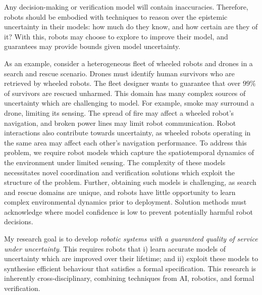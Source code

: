 \documentclass[12pt]{article}
\begin{document}

Any decision-making or verification model will contain inaccuracies.
%
Therefore, robots should be embodied with techniques to reason over the epistemic uncertainty in their models: how much do they know, and how certain are they of it?
%
With this, robots may choose to explore to improve their model, and guarantees may provide bounds given model uncertainty.

\fi

As an example, consider a heterogeneous fleet of wheeled robots and drones in a search and rescue scenario.
%
Drones must identify human survivors who are retrieved by wheeled robots.
%
The fleet designer wants to guarantee that over $99\%$ of survivors are rescued unharmed.
%
This domain has many complex sources of uncertainty which are challenging to model.
%
For example, smoke may surround a drone, limiting its sensing.
%
The spread of fire may affect a wheeled robot's navigation, and broken power lines may limit robot communication. 
%
Robot interactions also contribute towards uncertainty, as wheeled robots operating in the same area may affect each other's navigation performance.
%
To address this problem, we require robot models which capture the spatiotemporal dynamics of the environment under limited sensing.
%
The complexity of these models necessitates novel coordination and verification solutions which exploit the structure of the problem.
%
Further, obtaining such models is challenging, as search and rescue domains are unique, and robots have little opportunity to learn complex environmental dynamics prior to deployment.
%
Solution methods must acknowledge where model confidence is low to prevent potentially harmful robot decisions.


My research goal is to develop \emph{robotic systems with a guaranteed quality of service under uncertainty}.
%
This requires robots that i) learn accurate models of uncertainty which are improved over their lifetime; and ii) exploit these models to synthesise efficient behaviour that satisfies a formal specification.
%
This research is inherently cross-disciplinary, combining techniques from AI, robotics, and formal verification.
\end{document}
